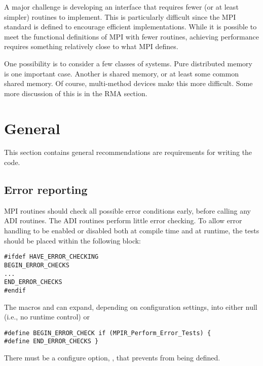 \documentclass{article}
\begin{document}
A major challenge is developing an interface that requires fewer (or
at least simpler) routines to implement.  This is particularly
difficult since the MPI standard is defined to encourage efficient
implementations.  While it is possible to meet the functional
definitions of MPI with fewer routines, achieving performance requires
something relatively close to what MPI defines.

One possibility is to consider a few classes of systems.  Pure
distributed memory is one important case.  Another is shared memory,
or at least some common shared memory.  Of course, multi-method
devices make this more difficult.  Some more discussion of this is in
the RMA section.

\section{General}
This section contains general recommendations are requirements for
writing the code.

\subsection{Error reporting}

MPI routines should check all possible error conditions early, before
calling any ADI routines.  The ADI routines perform little error
checking.  To allow error handling to be enabled or disabled both at compile
time 
and at runtime, the tests should be placed within the following block:
\begin{verbatim}
#ifdef HAVE_ERROR_CHECKING
BEGIN_ERROR_CHECKS
...
END_ERROR_CHECKS
#endif
\end{verbatim}
The macros  and  can
expand, depending on configuration settings, into either null (i.e.,
no runtime control) or 
\begin{verbatim}
#define BEGIN_ERROR_CHECK if (MPIR_Perform_Error_Tests) {
#define END_ERROR_CHECKS }
\end{verbatim}

There must be a configure option,
,  
that prevents  from being defined.
\end{document}
